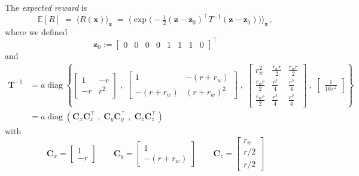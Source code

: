\documentclass{article}
\newcommand{\bfz}{{\vec z}}
\newcommand{\E}{{\mathbb E}}
\newcommand{\T}{^{\top}}
\renewcommand{\vec}[1]{\boldsymbol{#1}}
\newcommand{\mat}[1]{\boldsymbol{#1}}
\newcommand{\inv}{^{-1}}
\begin{document}
The \emph{expected reward} is
\[
\E[R]\;=\;\langle R(\vec x)\rangle_\bfz\;=\;\big\langle
\exp\big(-\tfrac{1}{2}(\bfz-\bfz_0)^\top
T^{-1}(\bfz-\bfz_0)\big)\big\rangle_\bfz \,,
\]
where we defined
\begin{equation*}
\vec z_0 := 
\begin{bmatrix}
0 & 0 & 0 & 0 & 1 & 1 & 1 & 0
\end{bmatrix}\T
\end{equation*}
and
\begin{equation*}
\begin{aligned}
\mat T\inv &=
a\operatorname{diag}\left\{
  \begin{bmatrix}
    1 & -r \\ -r & r^2
  \end{bmatrix}
\;,\;
\begin{bmatrix}
  1 & -(r+r_w) \\ -(r+r_w) & (r+r_w)^2
\end{bmatrix}
\;,\;
\begin{bmatrix}
r_w^2 & \frac{r_wr}{2} & \frac{r_wr}{2}\\
\frac{r_wr}{2} & \frac{r^2}{4} &  \frac{r^2}{4}\\
 \frac{r_wr}{2} & \frac{r^2}{4} &  \frac{r^2}{4}
\end{bmatrix}
\;,\;
\begin{bmatrix}
\frac{1}{16\pi^2}
\end{bmatrix}
\right\}\\
&= a \operatorname{diag}(\mat C_x \mat C_x \T \;,\; \mat C_y \mat C_y \T \;,\; \mat
C_z \mat C_z \T )
\end{aligned}
\end{equation*}
with
\begin{equation*}
\mat C_x =
\begin{bmatrix}
  1 \\ -r  
\end{bmatrix}
\qquad
\mat C_y = 
\begin{bmatrix}
1 \\ - (r + r_w)  
\end{bmatrix}
\qquad\mat C_z = 
\begin{bmatrix}
r_w \\ r/2 \\ r/2
\end{bmatrix}
\end{equation*}
\end{document}
